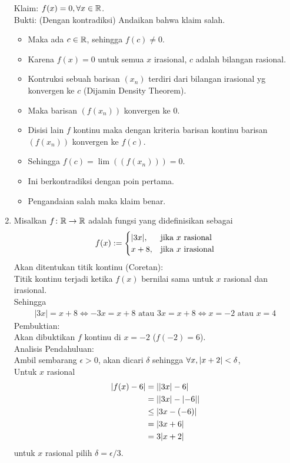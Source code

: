 \documentclass{article}
\begin{document}
\begin{enumerate}[leftmargin=*, label={\arabic*}.]
Klaim: $f(x)=0, \forall x \in \mathbb{R}$.\\
Bukti: (Dengan kontradiksi) Andaikan bahwa klaim salah.
\begin{itemize}
    \item Maka ada $c \in \mathbb{R}$, sehingga $f(c)\neq 0$.
    \item Karena $f(x)=0$ untuk semua $x$ irasional, $c$ adalah bilangan rasional.
    \item Kontruksi sebuah barisan $(x_n)$ terdiri dari bilangan irasional yg konvergen ke $c$ (Dijamin Density Theorem).
    \item Maka barisan $(f(x_n))$ konvergen ke $0$.
    \item Disisi lain $f$ kontinu maka dengan kriteria barisan kontinu barisan $(f(x_n))$ konvergen ke $f(c)$.
    \item Sehingga $f(c) = \lim((f(x_n))) = 0$.
    \item Ini berkontradiksi dengan poin pertama.
    \item Pengandaian salah maka klaim benar.
\end{itemize}



\item Misalkan $f\colon \mathbb{R} \to \mathbb{R}$ adalah fungsi yang didefinisikan sebagai
\[
    f(x):=\begin{cases}
        \lvert3x\rvert, &\text{jika $x$ rasional}\\
        x+8, &\text{jika $x$ irasional}
    \end{cases}
\]
Akan ditentukan titik kontinu (Coretan):\\
Titik kontinu terjadi ketika $f(x)$ bernilai sama untuk $x$ rasional dan irasional.\\
Sehingga
\begin{align*}
    |3x| = x+8 \iff -3x = x+8 \text{ atau } 3x = x+8 \iff x = -2 \text{ atau } x=4
\end{align*}
Pembuktian:\\
Akan dibuktikan $f$ kontinu di $x=-2$ ($f(-2)=6$).\\
Analisis Pendahuluan:\\
Ambil sembarang $\epsilon > 0$, akan dicari $\delta$ sehingga $\forall x, \lvert x+2\rvert<\delta$,\\
Untuk $x$ rasional
\begin{align*}
    |f(x)-6| &= \lvert\lvert3x\rvert-6\rvert \\
    &= \lvert\lvert3x\rvert-\lvert-6\rvert\rvert\\
    &\leq |3x-(-6)|\\
    &= |3x+6|\\
    &=3|x+2|
\end{align*}
untuk $x$ rasional pilih $\delta = \epsilon/3$.


\end{enumerate}
\end{document}
